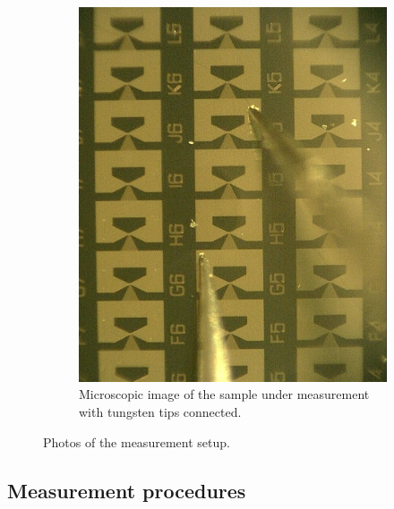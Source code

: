 \begin{figure}[H]
\begin{subfigure}[t]{0.35\paperwidth}
        \includegraphics[width=0.3\paperwidth]{img/05/SetupPhotoMicro.jpg}
        \caption{Microscopic image of the sample under measurement with tungsten tips connected.}
        \label{ExperimentMeasurementPhotob}
    \end{subfigure}
    \caption{Photos of the measurement setup.}
    \label{ExperimentMeasurementPhoto}
\end{figure}

\subsection{Measurement procedures} \label{sec:ExperimentMeasurementProcedures}

